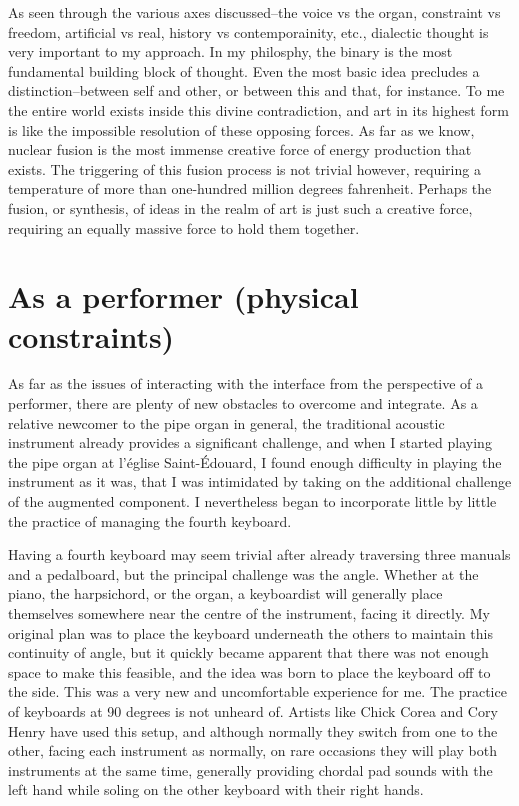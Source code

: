 \documentclass[12pt,twoside,maitrise]{dms}
\theoremstyle{definition}
\begin{document}
As seen through the various axes discussed--the voice vs the organ, constraint vs freedom, artificial vs real, history vs contemporainity, etc., dialectic thought is very important to my approach.
In my philosphy, the binary is the most fundamental building block of thought.
Even the most basic idea precludes a distinction--between self and other, or between this and that, for instance.
To me the entire world exists inside this divine contradiction, and art in its highest form is like the impossible resolution of these opposing forces.
As far as we know, nuclear fusion is the most immense creative force of energy production that exists.
The triggering of this fusion process is not trivial however, requiring a temperature of more than one-hundred million degrees fahrenheit.
Perhaps the fusion, or synthesis, of ideas in the realm of art is just such a creative force, requiring an equally massive force to hold them together.

\section{As a performer (physical constraints)}
As far as the issues of interacting with the interface from the perspective of a performer, there are plenty of new obstacles to overcome and integrate. As a relative newcomer to the pipe organ in general, the traditional acoustic instrument already provides a significant challenge, and when I started playing the pipe organ at l’église Saint-Édouard, I found enough difficulty in playing the instrument as it was, that I was intimidated by taking on the additional challenge of the augmented component. I nevertheless began to incorporate little by little the practice of managing the fourth keyboard. 

Having a fourth keyboard may seem trivial after already traversing three manuals and a pedalboard, but the principal challenge was the angle. Whether at the piano, the harpsichord, or the organ, a keyboardist will generally place themselves somewhere near the centre of the instrument, facing it directly. My original plan was to place the keyboard underneath the others to maintain this continuity of angle, but it quickly became apparent that there was not enough space to make this feasible, and the idea was born to place the keyboard off to the side. This was a very new and uncomfortable experience for me. The practice of keyboards at 90 degrees is not unheard of. Artists like Chick Corea and Cory Henry have used this setup, and although normally they switch from one to the other, facing each instrument as normally, on rare occasions they will play both instruments at the same time, generally providing chordal pad sounds with the left hand while soling on the other keyboard with their right hands. 
\end{document}
